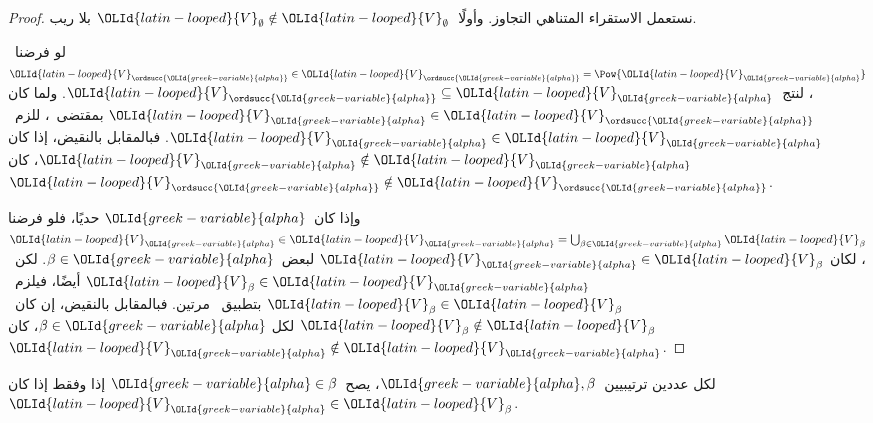 \documentclass[../../../include/open-logic-section]{subfiles}
\begin{document}
\begin{proof}
نستعمل الاستقراء المتناهي التجاوز. وأولًا~${\OLId{latin-looped}{V}}_\emptyset \notin {\OLId{latin-looped}{V}}_\emptyset$
بلا ريب.

لو فرضنا~${\OLId{latin-looped}{V}}_{\ordsucc{{\OLId{greek-variable}{alpha}}}} \in {\OLId{latin-looped}{V}}_{\ordsucc{{\OLId{greek-variable}{alpha}}}} = \Pow{{\OLId{latin-looped}{V}}_{\OLId{greek-variable}{alpha}}}$،
لنتج~${\OLId{latin-looped}{V}}_{\ordsucc{{\OLId{greek-variable}{alpha}}}} \subseteq {\OLId{latin-looped}{V}}_{\OLId{greek-variable}{alpha}}$. ولما كان
${\OLId{latin-looped}{V}}_{\OLId{greek-variable}{alpha}} \in {\OLId{latin-looped}{V}}_{\ordsucc{{\OLId{greek-variable}{alpha}}}}$ بمقتضى~،
للزم~${\OLId{latin-looped}{V}}_{\OLId{greek-variable}{alpha}} \in {\OLId{latin-looped}{V}}_{\OLId{greek-variable}{alpha}}$. فبالمقابل بالنقيض، إذا كان
${\OLId{latin-looped}{V}}_{\OLId{greek-variable}{alpha}} \notin {\OLId{latin-looped}{V}}_{\OLId{greek-variable}{alpha}}$، كان~${\OLId{latin-looped}{V}}_{\ordsucc{{\OLId{greek-variable}{alpha}}}} \notin {\OLId{latin-looped}{V}}_{\ordsucc{{\OLId{greek-variable}{alpha}}}}$.

وإذا كان~${\OLId{greek-variable}{alpha}}$ حديًا، فلو فرضنا
${\OLId{latin-looped}{V}}_{\OLId{greek-variable}{alpha}} \in {\OLId{latin-looped}{V}}_{\OLId{greek-variable}{alpha}} = \bigcup_{\beta \in {\OLId{greek-variable}{alpha}}}{\OLId{latin-looped}{V}}_\beta$، لكان
${\OLId{latin-looped}{V}}_{\OLId{greek-variable}{alpha}} \in {\OLId{latin-looped}{V}}_\beta$ لبعض~$\beta \in {\OLId{greek-variable}{alpha}}$. لكن~${\OLId{latin-looped}{V}}_\beta \in {\OLId{latin-looped}{V}}_{\OLId{greek-variable}{alpha}}$
أيضًا، فيلزم~${\OLId{latin-looped}{V}}_\beta \in {\OLId{latin-looped}{V}}_\beta$ بتطبيق~
مرتين. فبالمقابل بالنقيض، إن كان~${\OLId{latin-looped}{V}}_\beta \notin {\OLId{latin-looped}{V}}_\beta$ لكل
$\beta \in {\OLId{greek-variable}{alpha}}$، كان~${\OLId{latin-looped}{V}}_{\OLId{greek-variable}{alpha}} \notin {\OLId{latin-looped}{V}}_{\OLId{greek-variable}{alpha}}$.
\end{proof}

\begin{cor}
لكل عددين ترتيبيين~${\OLId{greek-variable}{alpha}}, \beta$، يصح~${\OLId{greek-variable}{alpha}} \in \beta$ إذا
وفقط إذا كان~${\OLId{latin-looped}{V}}_{\OLId{greek-variable}{alpha}} \in {\OLId{latin-looped}{V}}_\beta$.
\end{cor}
\end{document}
